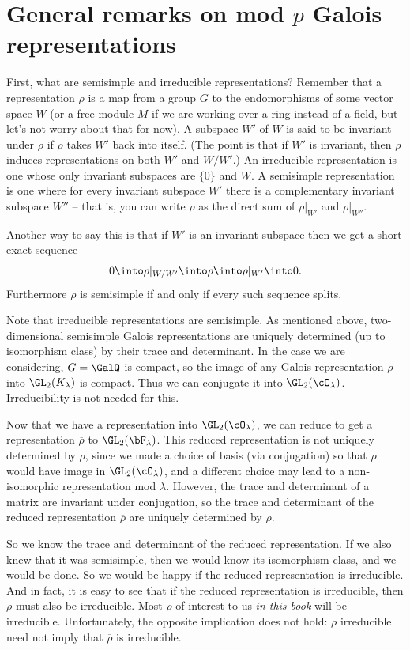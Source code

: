 \documentclass{report}
\begin{document}
\section{General remarks on mod $p$ Galois representations}\label{sec:modprep}
\label{sec:wetherell}
First, what are semisimple and irreducible representations?  Remember
that a representation $\rho$ is a map from a group $G$ to the endomorphisms of
some vector space $W$ (or a free module $M$ if we are working over a ring
instead of a field, but let's not worry about that for now).  A subspace $W'$
of $W$ is said to be invariant under $\rho$ if $\rho$ takes $W'$ back into itself.
(The point is that if $W'$ is invariant, then $\rho$ induces representations on
both $W'$ and $W/W'$.)  An irreducible representation is one whose only
invariant subspaces are $\{0\}$ and $W$.  A semisimple representation is one
where for every invariant subspace $W'$ there is a complementary invariant
subspace $W''$ -- that is, you can write $\rho$ as the direct sum of $\rho|_{W'}$
and $\rho|_{W''}$.

Another way to say this is that if $W'$ is an invariant subspace then we get a
short exact sequence $$0\into\rho|_{W/W'}\into\rho\into\rho|_{W'}\into 0.$$
Furthermore $\rho$ is
semisimple if and only if every such sequence splits.

Note that irreducible representations are semisimple.  As mentioned
above, two-dimensional semisimple Galois representations are uniquely
determined (up to isomorphism class) by their trace and determinant.
In the case we are considering, $G = \GalQ$ is compact, so the image
of any Galois representation $\rho$ into $\GL_2(K_{\lambda})$ is
compact.  Thus we can conjugate it into $\GL_2(\cO_{\lambda})$.
Irreducibility is not needed for this.

Now that we have a representation into $\GL_2(\cO_{\lambda})$, we can
reduce to get a representation $\overline{\rho}$ to
$\GL_2(\bF_{\lambda})$.  This reduced representation is not uniquely
determined by $\rho$, since we made a choice of basis (via
conjugation) so that $\rho$ would have image in
$\GL_2(\cO_{\lambda})$, and a different choice may lead to a
non-isomorphic representation mod $\lambda$.  However, the trace and
determinant of a matrix are invariant under conjugation, so the trace
and determinant of the reduced representation $\overline{\rho}$ are
uniquely determined by $\rho$.

So we know the trace and determinant of the reduced representation.  If we
also knew that it was semisimple, then we would know its isomorphism class,
and we would be done.  So we would be happy if the reduced representation is
irreducible.  And in fact, it is easy to see that if the reduced
representation is irreducible, then $\rho$ must also be irreducible.
Most $\rho$ of interest to us {\em in this book} will be irreducible.
Unfortunately, the opposite implication does not hold:
$\rho$ irreducible need not imply that $\overline{\rho}$ is irreducible.
\end{document}
